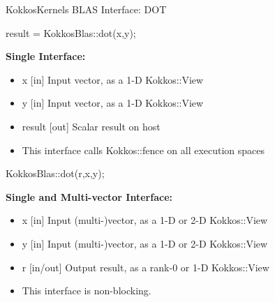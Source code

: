 
\begin{frame}[fragile]{KokkosKernels BLAS Interface: DOT}

\begin{code}[basicstyle=\large, keywords={double,gemv,dot}]
result = KokkosBlas::dot(x,y);
\end{code}

\textbf {Single Interface:}

\begin{itemize}
  \item x [in] Input vector, as a 1-D Kokkos::View
  \item y [in] Input vector, as a 1-D Kokkos::View
  \item result [out] Scalar result on host
  \item This interface calls Kokkos::fence on all execution spaces
\end{itemize}

\begin{code}[basicstyle=\large, keywords={double,gemv,dot}]
KokkosBlas::dot(r,x,y);
\end{code}

\textbf {Single and Multi-vector Interface:}

\begin{itemize}
  \item x [in] Input (multi-)vector, as a 1-D or 2-D Kokkos::View
  \item y [in] Input (multi-)vector, as a 1-D or 2-D Kokkos::View
  \item r [in/out] Output result, as a rank-0 or 1-D Kokkos::View
  \item This interface is non-blocking.
\end{itemize}

\end{frame}


